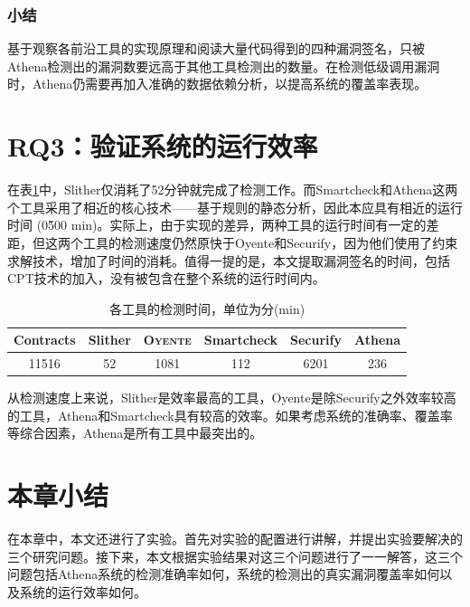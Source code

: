 \subsubsection{小结}

基于观察各前沿工具的实现原理和阅读大量代码得到的四种漏洞签名，只被Athena检测出的漏洞数要远高于其他工具检测出的数量。在检测低级调用漏洞时，Athena仍需要再加入准确的数据依赖分析，以提高系统的覆盖率表现。

\section{RQ3：验证系统的运行效率}

在表\ref{tab:time_cost}中，Slither仅消耗了52分钟就完成了检测工作。而Smartcheck和Athena这两个工具采用了相近的核心技术——基于规则的静态分析，因此本应具有相近的运行时间 (0\~500 min)。实际上，由于实现的差异，两种工具的运行时间有一定的差距，但这两个工具的检测速度仍然原快于Oyente和Securify，因为他们使用了约束求解技术，增加了时间的消耗。值得一提的是，本文提取漏洞签名的时间，包括CPT技术的加入，没有被包含在整个系统的运行时间内。

\begin{table}
  \centering
  \caption{各工具的检测时间，单位为分(min)}
  \begin{tabular}{cccccc}
    \toprule
    Contracts & Slither & \textsc{Oyente} & Smartcheck & Securify & Athena \\
    \midrule
    11516 & 52 & 1081 & 112 & 6201 & 236 \\
    \bottomrule
  \end{tabular}
  \label{tab:time_cost}
\end{table}

从检测速度上来说，Slither是效率最高的工具，Oyente是除Securify之外效率较高的工具，Athena和Smartcheck具有较高的效率。如果考虑系统的准确率、覆盖率等综合因素，Athena是所有工具中最突出的。

\section{本章小结}
在本章中，本文还进行了实验。首先对实验的配置进行讲解，并提出实验要解决的三个研究问题。接下来，本文根据实验结果对这三个问题进行了一一解答，这三个问题包括Athena系统的检测准确率如何，系统的检测出的真实漏洞覆盖率如何以及系统的运行效率如何。